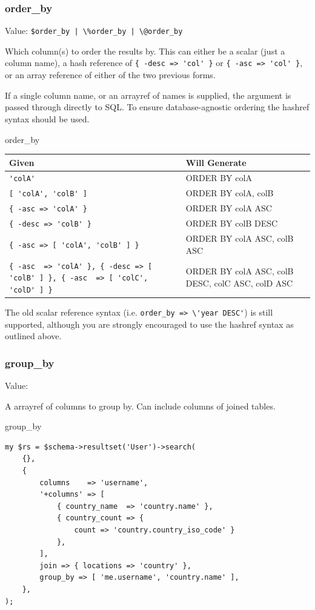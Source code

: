 \subsubsection{order\_by}

Value: \verb=$order_by | \%order_by | \@order_by=

Which column(s) to order the results by. This can either be a scalar (just a
column name), a hash reference of \verb|{ -desc => 'col' }| or 
\verb|{ -asc => 'col' }|, or an array reference of either of the two
previous forms.

If a single column name, or an arrayref of names is supplied, the argument
is passed through directly to SQL. To ensure database-agnostic ordering the
hashref syntax should be used.

\begin{frame}[fragile]{order\_by}
\begin{table}
\begin{tabular}{l | l}
Given & Will Generate \\
\hline
\verb|'colA'| & ORDER BY colA \\ 
\verb|[ 'colA', 'colB' ]| & ORDER BY colA, colB \\
\verb|{ -asc => 'colA' }| & ORDER BY colA ASC \\
\verb|{ -desc => 'colB' }| & ORDER BY colB DESC \\
\verb|{ -asc => [ 'colA', 'colB' ] }| & ORDER BY colA ASC, colB ASC \\
\verb|{ -asc  => 'colA' }, { -desc => [ 'colB' ] }, { -asc  => [ 'colC', 'colD' ] }|
& ORDER BY colA ASC,
     colB DESC,
     colC ASC, colD ASC \\
\end{tabular}
\end{table}
\end{frame}

The old scalar reference syntax (i.e. \verb|order_by => \'year DESC'|) is
still supported, although you are strongly encouraged to use the hashref
syntax as outlined above.

\subsubsection{group\_by}

Value: \@columns

A arrayref of columns to group by. Can include columns of joined tables.

\begin{frame}[fragile]{group\_by}
\begin{lstlisting}
my $rs = $schema->resultset('User')->search(
    {},
    {
        columns    => 'username',
        '+columns' => [ 
            { country_name  => 'country.name' },
            { country_count => {
                count => 'country.country_iso_code' }
            },
        ],
        join => { locations => 'country' },
        group_by => [ 'me.username', 'country.name' ],
    },
);
\end{lstlisting}
\end{frame}

